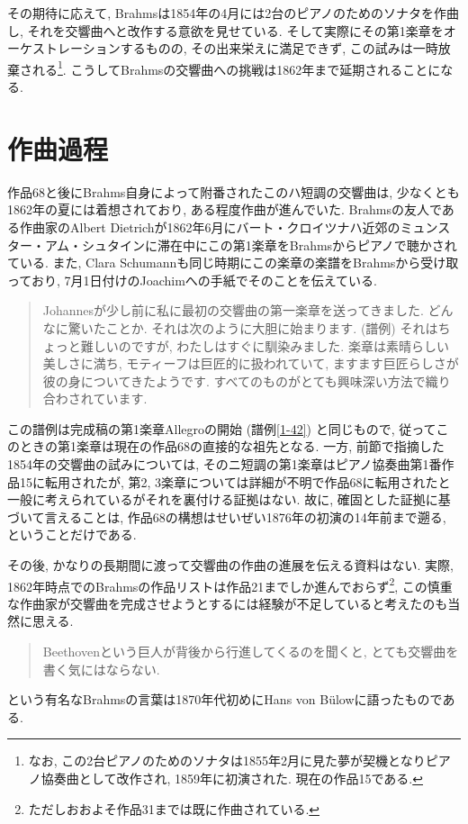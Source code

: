 その期待に応えて, Brahmsは1854年の4月には2台のピアノのためのソナタを作曲し, それを交響曲へと改作する意欲を見せている\cite{compos}.
そして実際にその第1楽章をオーケストレーションするものの, その出来栄えに満足できず, この試みは一時放棄される\footnote{なお,
この2台ピアノのためのソナタは1855年2月に見た夢が契機となりピアノ協奏曲として改作され, 1859年に初演された. 現在の作品15である.}.
こうしてBrahmsの交響曲への挑戦は1862年まで延期されることになる.


\section{作曲過程}\label{sec: process}

作品68と後にBrahms自身によって附番されたこのハ短調の交響曲は, 少なくとも1862年の夏には着想されており, ある程度作曲が進んでいた.
Brahmsの友人である作曲家のAlbert Dietrichが1862年6月にバート・クロイツナハ近郊のミュンスター・アム・シュタインに滞在中にこの第1楽章をBrahmsからピアノで聴かされている\cite{kaisouroku}.
また, Clara Schumannも同じ時期にこの楽章の楽譜をBrahmsから受け取っており, 7月1日付けのJoachimへの手紙でそのことを伝えている.
\begin{quote}
	Johannesが少し前に私に最初の交響曲の第一楽章を送ってきました. どんなに驚いたことか. それは次のように大胆に始まります.
	(譜例) %
	それはちょっと難しいのですが, わたしはすぐに馴染みました.
	楽章は素晴らしい美しさに満ち, モティーフは巨匠的に扱われていて, ますます巨匠らしさが彼の身についてきたようです.
	すべてのものがとても興味深い方法で織り合わされています.\cite{compos}
\end{quote}
この譜例は完成稿の第1楽章Allegroの開始 (譜例\ref{1-42}) と同じもので, 従ってこのときの第1楽章は現在の作品68の直接的な祖先となる.
一方, 前節で指摘した1854年の交響曲の試みについては, そのニ短調の第1楽章はピアノ協奏曲第1番作品15に転用されたが,
第2, 3楽章については詳細が不明で作品68に転用されたと一般に考えられているがそれを裏付ける証拠はない.
故に, 確固とした証拠に基づいて言えることは, 作品68の構想はせいぜい1876年の初演の14年前まで遡る, ということだけである.

その後, かなりの長期間に渡って交響曲の作曲の進展を伝える資料はない.
実際, 1862年時点でのBrahmsの作品リストは作品21までしか進んでおらず\footnote{ただしおおよそ作品31までは既に作曲されている.},
この慎重な作曲家が交響曲を完成させようとするには経験が不足していると考えたのも当然に思える.
\begin{quote}
	Beethovenという巨人が背後から行進してくるのを聞くと, とても交響曲を書く気にはならない.\cite{denki}
\end{quote}
という有名なBrahmsの言葉は1870年代初めにHans von Bülowに語ったものである\cite{library}.

